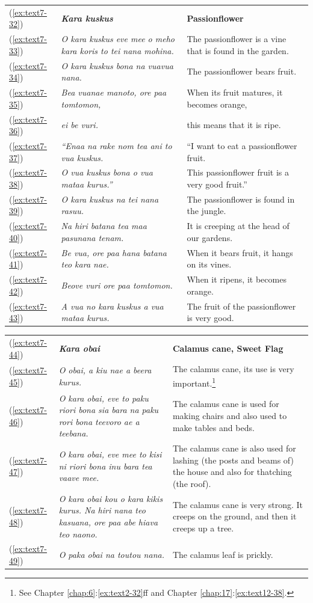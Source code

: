 \documentclass[output=paper]{langscibook}
\begin{document}
\begin{xltabular}{\textwidth}{lXX}
	(\ref{ex:text7-32})&\textbf{\textit{Kara kuskus}}&\textbf{Passionflower}\\
	(\ref{ex:text7-33})&\textit{O kara kuskus eve mee o meho kara koris to tei nana mohina.}&The passionflower is a vine that is found in the garden.\\
	(\ref{ex:text7-34})&\textit{O kara kuskus bona na vuavua nana.}&The passionflower bears fruit.\\
	(\ref{ex:text7-35})&\textit{Bea vuanae manoto, ore paa tomtomon,}&When its fruit matures, it becomes orange,\\
	(\ref{ex:text7-36})&\textit{ei be vuri.}&this means that it is ripe.\\
	(\ref{ex:text7-37})&\textit{``Enaa na rake nom tea ani to vua kuskus.}&``I want to eat a passionflower fruit.\\
	(\ref{ex:text7-38})&\textit{O vua kuskus bona o vua mataa kurus.''}&This passionflower fruit is a very good fruit.''\\
	(\ref{ex:text7-39})&\textit{O kara kuskus na tei nana rasuu.}&The passionflower is found in the jungle.\\
	(\ref{ex:text7-40})&\textit{Na hiri batana tea maa pasunana tenam.}&It is creeping at the head of our gardens.\\
	(\ref{ex:text7-41})&\textit{Be vua, ore paa hana batana teo kara nae.}&When it bears fruit, it hangs on its vines.\\
	(\ref{ex:text7-42})&\textit{Beove vuri ore paa tomtomon.}&When it ripens, it becomes orange.\\
	(\ref{ex:text7-43})&\textit{A vua no kara kuskus a vua mataa kurus.}&The fruit of the passionflower is very good.\\
\end{xltabular}
\begin{xltabular}{\textwidth}{lXX}
	(\ref{ex:text7-44})&\textbf{\textit{Kara obai}}&\textbf{Calamus cane, Sweet Flag}\\
	(\ref{ex:text7-45})&\textit{O obai, a kiu nae a beera kurus.}&The calamus cane, its use is very important.\footnote{See Chapter \ref{chap:6}:\ref{ex:text2-32}ff and Chapter \ref{chap:17}:\ref{ex:text12-38}.}\\
	(\ref{ex:text7-46})&\textit{O kara obai, eve to paku riori bona sia bara na paku rori bona teevoro ae a teebana.}&The calamus cane is used for making chairs and also used to make tables and beds.\\
	(\ref{ex:text7-47})&\textit{O kara obai, eve mee to kisi ni riori bona inu bara tea vaave mee.}&The calamus cane is also used for lashing (the posts and beams of) the house and also for thatching (the roof).\\
	(\ref{ex:text7-48})&\textit{O kara obai kou o kara kikis kurus. Na hiri nana teo kasuana, ore paa abe hiava teo naono.}&The calamus cane is very strong. It creeps on the ground, and then it creeps up a tree.\\
	(\ref{ex:text7-49})&\textit{O paka obai na toutou nana.   }&The calamus leaf is prickly.  \\
\end{xltabular}
\end{document}

